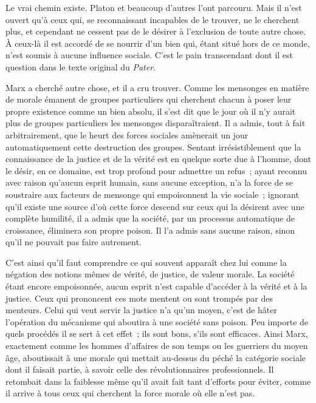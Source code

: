 \documentclass[french,twoside]{book} %
\begin{document}
Le vrai chemin existe. Platon et beaucoup d'autres l'ont parcouru. Mais il n'est ouvert qu'à ceux qui, se reconnaissant incapables de le trouver, ne le cherchent plus, et cependant ne cessent pas de le désirer à l'exclusion de toute autre chose. À ceux-là il est accordé de se nourrir d'un bien qui, étant situé hors de ce monde, n'est soumis à aucune influence sociale. C'est le pain transcendant dont il est question dans le texte original du {\itshape Pater}.\par
Marx a cherché autre chose, et il a cru trouver. Comme les mensonges en matière de morale émanent de groupes particuliers qui cherchent chacun à poser leur propre existence comme un bien absolu, il s'est dit que le jour où il n'y aurait plus de groupes particuliers les mensonges disparaîtraient. Il a admis, tout à fait arbitrairement, que le heurt des forces sociales amènerait un jour automatiquement cette destruction des groupes. Sentant irrésistiblement que la connaissance de la justice et de la vérité est en quelque sorte due à l'homme, dont le désir, en ce domaine, est trop profond pour admettre un refus ; ayant reconnu avec raison qu'aucun esprit humain, sans aucune exception, n'a la force de se soustraire aux facteurs de mensonge qui empoisonnent la vie sociale ; ignorant qu'il existe une source d'où cette force descend sur ceux qui la désirent avec une complète humilité, il a admis que la société, par un processus automatique de croissance, éliminera son propre poison. Il l'a admis sans aucune raison, sinon qu'il ne pouvait pas faire autrement.\par
C'est ainsi qu'il faut comprendre ce qui souvent apparaît chez lui comme la négation des notions mêmes de vérité, de justice, de valeur morale. La société étant encore empoisonnée, aucun esprit n'est capable d'accéder à la vérité et à la justice. Ceux qui prononcent ces mots mentent ou sont trompés par des menteurs. Celui qui veut servir la justice n'a qu'un moyen, c'est de hâter l'opération du mécanisme qui aboutira à une société sans poison. Peu importe de quels procédés il se sert à cet effet ; ils sont bons, s'ils sont efficaces. Ainsi Marx, exactement comme les hommes d'affaires de son temps ou les guerriers du moyen âge, aboutissait à une morale qui mettait au-dessus du péché la catégorie sociale dont il faisait partie, à savoir celle des révolutionnaires professionnels. Il retombait dans la faiblesse même qu'il avait fait tant d'efforts pour éviter, comme il arrive à tous ceux qui cherchent la force morale où elle n'est pas.\par
\end{document}
